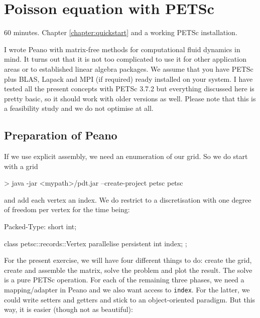 \section{Poisson equation with PETSc}
  \label{section:applications:petsc}

\chapterDescription
  {
    60 minutes.
  }
  {
    Chapter \ref{chapter:quickstart} and a working PETSc installation.
  }

I wrote Peano with matrix-free methods for computational fluid dynamics in mind. 
It turns out that it is not too complicated to use it for other application
areas or to established linear algebra packages.
We assume that you have PETSc plus BLAS, Lapack and MPI (if required) ready
installed on your system.
I have tested all the present concepts with PETSc 3.7.2 but everything discussed
here is pretty basic, so it should work with older versions as well.
Please note that this is a feasibility study and we do not optimise at all.


\subsection{Preparation of Peano}

If we use explicit assembly, we need an enumeration of our grid. 
So we do start with a grid
\begin{code}
> java -jar <mypath>/pdt.jar --create-project petsc petsc
\end{code}

\noindent
and add each vertex an index. 
We do restrict to a discretisation with one degree of freedom per vertex for the
time being:

\begin{code}
Packed-Type: short int;

class petsc::records::Vertex {  
  parallelise persistent int index;
};
\end{code}

\noindent
For the present exercise, we will have four different things to do:
create the grid, create and assemble the matrix, solve the problem and plot the
result.
The solve is a pure PETSc operation.
For each of the remaining three phases, we need a mapping/adapter in Peano and
we also want access to \texttt{index}.
For the latter, we could write setters and getters and stick to an
object-oriented paradigm.
But this way, it is easier (though not as beautiful):

